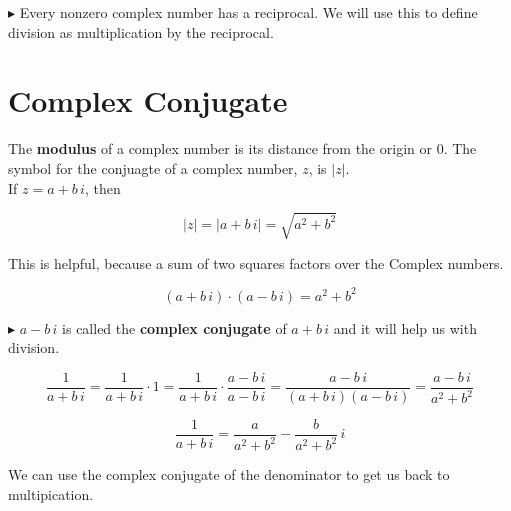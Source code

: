 \documentclass{ximera}
\begin{document}
$\blacktriangleright$  Every nonzero complex number has a reciprocal.  We will use this to define division as multiplication by the reciprocal.





\section{Complex Conjugate}


The \textbf{modulus} of a complex number is its distance from the origin or $0$.  The symbol for the conjuagte of a complex number, $z$, is $|z|$.  \\

If $z = a + b \, i$, then

\[    |z| = |a + b \, i| = \sqrt{a^2 + b^2}          \]



This is helpful, because a sum of two squares factors over the Complex numbers.



\[   (a + b \, i) \cdot    (a - b \, i)  = a^2 + b^2   \]



$\blacktriangleright$  $a - b \, i$ is called the \textbf{complex conjugate} of $a + b \, i$ and it will help us with division.




\[   \frac{1}{a + b \, i} =   \frac{1}{a + b \, i} \cdot 1 = \frac{1}{a + b \, i} \cdot \frac{a - b \, i}{a - b \, i}  =  \frac{a - b \, i}{(a + b \, i)(a - b \, i)} =   \frac{a - b \, i}{a^2 + b^2}  \]


\[  \frac{1}{a + b \, i}   =  \frac{a}{a^2 + b^2} - \frac{b}{a^2 + b^2} \, i      \]


We can use the complex conjugate of the denominator to get us back to multipication.
\end{document}
